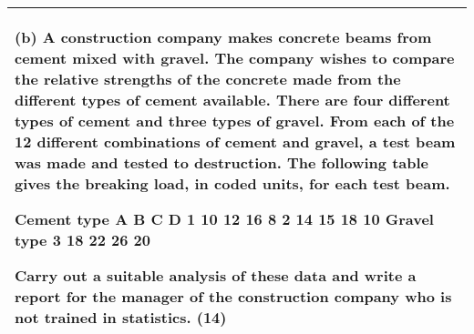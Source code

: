\documentclass[a4paper,12pt]{article}
\begin{document}
\begin{table}[ht!]
 
\centering
 
\begin{tabular}{|p{15cm}|}
 
\hline  
  
(b) A construction company makes concrete beams from cement mixed with gravel.  
The company wishes to compare the relative strengths of the concrete made from the different types of cement available.  There are four different types of cement and three types of gravel.  From each of the 12 different combinations of cement and gravel, a test beam was made and tested to destruction.  The following table gives the breaking load, in coded units, for each test beam. 
 
  Cement type   A B C D 
  1 10 12 16 8 2 14 15 18 10 
  Gravel type 3 18 22 26 20 
 
 
Carry out a suitable analysis of these data and write a report for the manager of the construction company who is not trained in statistics. (14) 
 
\\ \hline
  
\end{tabular}

\end{table} 
\end{document}
